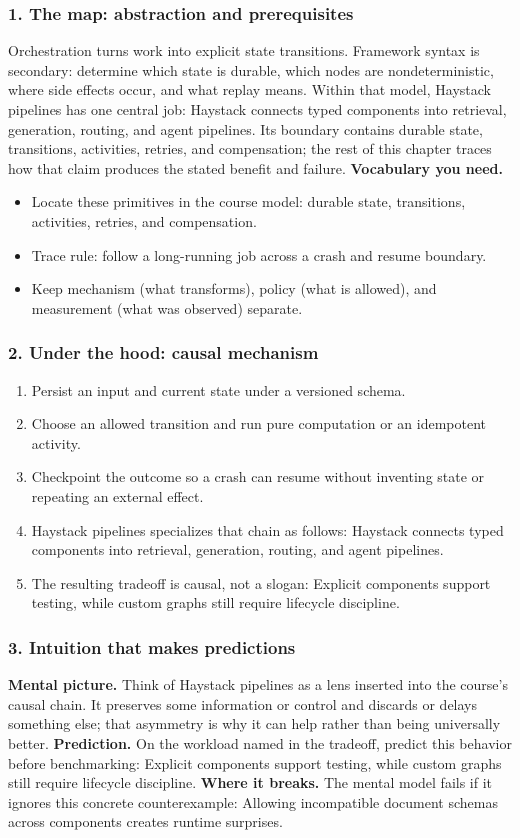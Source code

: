 \subsubsection*{1. The map: abstraction and prerequisites}
Orchestration turns work into explicit state transitions. Framework syntax is secondary: determine which state is durable, which nodes are nondeterministic, where side effects occur, and what replay means.
Within that model, Haystack pipelines has one central job: Haystack connects typed components into retrieval, generation, routing, and agent pipelines. Its boundary contains durable state, transitions, activities, retries, and compensation; the rest of this chapter traces how that claim produces the stated benefit and failure.
\textbf{Vocabulary you need.}\begin{itemize}
\item Locate these primitives in the course model: durable state, transitions, activities, retries, and compensation.
\item Trace rule: follow a long-running job across a crash and resume boundary.
\item Keep mechanism (what transforms), policy (what is allowed), and measurement (what was observed) separate.
\end{itemize}
\subsubsection*{2. Under the hood: causal mechanism}\begin{enumerate}
\item Persist an input and current state under a versioned schema.
\item Choose an allowed transition and run pure computation or an idempotent activity.
\item Checkpoint the outcome so a crash can resume without inventing state or repeating an external effect.
\item Haystack pipelines specializes that chain as follows: Haystack connects typed components into retrieval, generation, routing, and agent pipelines.
\item The resulting tradeoff is causal, not a slogan: Explicit components support testing, while custom graphs still require lifecycle discipline.
\end{enumerate}
\subsubsection*{3. Intuition that makes predictions}
\textbf{Mental picture.} Think of Haystack pipelines as a lens inserted into the course's causal chain. It preserves some information or control and discards or delays something else; that asymmetry is why it can help rather than being universally better.
\textbf{Prediction.} On the workload named in the tradeoff, predict this behavior before benchmarking: Explicit components support testing, while custom graphs still require lifecycle discipline.
\textbf{Where it breaks.} The mental model fails if it ignores this concrete counterexample: Allowing incompatible document schemas across components creates runtime surprises.
